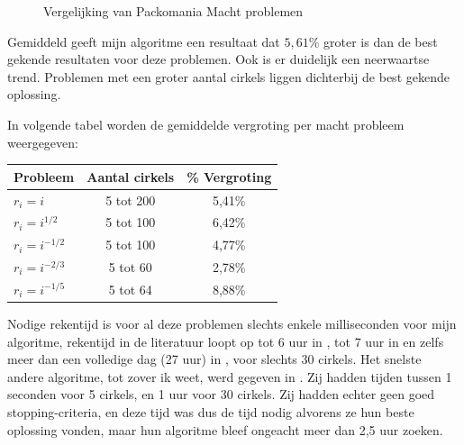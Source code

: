 \documentclass[12pt,a4paper,oneside]{book}
\begin{document}
{\begin {figure}
{
	}
	\caption{Vergelijking van Packomania Macht problemen}
	\label{fig:vergelijking-packomania-macht}
\end {figure}

Gemiddeld geeft mijn algoritme een resultaat dat $5,61\%$ groter is dan de best gekende resultaten voor deze problemen.
Ook is er duidelijk een neerwaartse trend.
Problemen met een groter aantal cirkels liggen dichterbij de best gekende oplossing.

In volgende tabel worden de gemiddelde vergroting per macht probleem weergegeven:

\begin{tabularx}{\textwidth}{ l c c }
\caption{Packomania Machten gemiddelde vergroting}
\\\toprule
Probleem & Aantal cirkels & \% Vergroting \\
\midrule
\endhead
$r_i = i$ & 5 tot 200 & 5,41\% \\
$r_i = i^{1/2}$ & 5 tot 100 & 6,42\% \\
$r_i = i^{-1/2}$ & 5 tot 100 & 4,77\% \\
$r_i = i^{-2/3}$  & 5 tot 60 & 2,78\% \\
$r_i = i^{-1/5}$ & 5 tot 64 & 8,88\% \\
\bottomrule
\end{tabularx}

Nodige rekentijd is voor al deze problemen slechts enkele milliseconden voor mijn algoritme, rekentijd in de literatuur loopt op tot 6 uur in \cite{jors2011}, tot 7 uur in \cite{lopez2013packing} en zelfs meer dan een volledige dag (27 uur) in \cite{zeng2016iterated}, voor slechts 30 cirkels.
Het snelste andere algoritme, tot zover ik weet, werd gegeven in \cite{ye2013iterated}.
Zij hadden tijden tussen 1 seconden voor 5 cirkels, en 1 uur voor 30 cirkels.
Zij hadden echter geen goed stopping-criteria, en deze tijd was dus de tijd nodig alvorens ze hun beste oplossing vonden, maar hun algoritme bleef ongeacht meer dan 2,5 uur zoeken.

}
\end{document}
